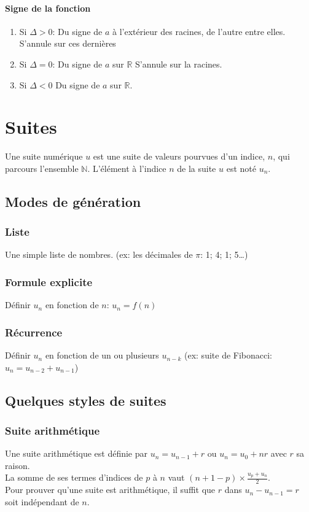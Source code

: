 \documentclass{article}
\begin{document}
\paragraph{Signe de la fonction}
\begin{enumerate}
	\item Si $\Delta > 0$: Du signe de $a$ à l'extérieur des racines, de l'autre entre elles. S'annule sur ces dernières
	\item Si $\Delta = 0$: Du signe de $a$ sur $\mathbb{R}$ S'annule sur la racines.
	\item Si $\Delta < 0$ Du signe de $a$ sur $\mathbb{R}$.
\end{enumerate}



\section{Suites}


Une suite numérique $u$ est une suite de valeurs pourvues d'un indice, $n$, qui parcours l'ensemble $\mathbb{N}$. L'élément à l'indice $n$ de la suite $u$ est noté $u_n$.


\subsection{Modes de génération}

\subsubsection{Liste}
Une simple liste de nombres. (ex: les décimales de $\pi$: 1; 4; 1; 5\dots)

\subsubsection{Formule explicite}
Définir $u_n$ en fonction de $n$: $u_n = f(n)$

\subsubsection{Récurrence}
Définir $u_n$ en fonction de un ou plusieurs $u_{n-k}$ (ex: suite de Fibonacci: $u_n = u_{n-2} + u_{n-1}$)


\subsection{Quelques styles de suites}

\subsubsection{Suite arithmétique}
Une suite arithmétique est définie par $u_n = u_{n-1} + r$ ou $u_n = u_0 + nr$ avec $r$ sa raison.\\
La somme de ses termes d'indices de $p$ à $n$ vaut $(n+1-p)\times \frac{u_p+u_n}{2}$.\\
Pour prouver qu'une suite est arithmétique, il suffit que $r$ dans $u_n - u_{n-1} = r$ soit indépendant de $n$.
\end{document}

